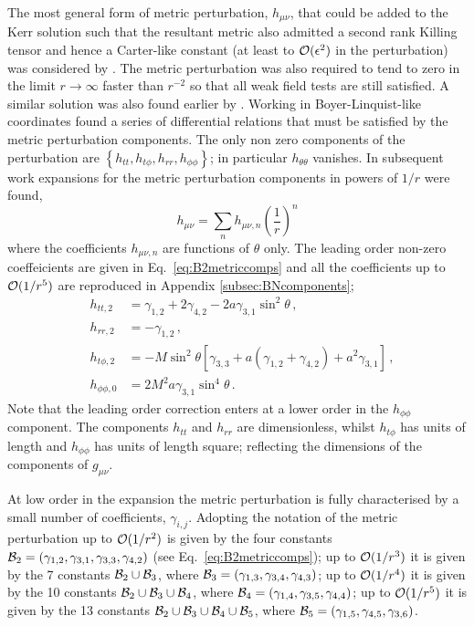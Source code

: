 The most general form of metric perturbation, $h_{\mu\nu}$, that could be added to the Kerr solution such that the resultant metric also admitted a second rank Killing tensor and hence a Carter-like constant (at least to ${\cal{O}} (\epsilon ^{2})$ in the perturbation) was considered by \cite{2011PhRvD..83j4027V}. The metric perturbation was also required to tend to zero in the limit $r\rightarrow\infty$ faster than $r^{-2}$ so that all weak field tests are still satisfied. A similar solution was also found earlier by \cite{1979GReGr..10...79B}. Working in Boyer-Linquist-like coordinates \cite{2011PhRvD..83j4027V} found a series of differential relations that must be satisfied by the metric perturbation components. The only non zero components of the perturbation are $\left\{ h_{tt}, h_{t \phi }, h_{rr}, h_{ \phi \phi } \right\}$; in particular $h_{\theta\theta}$ vanishes. In subsequent work \cite{2011PhRvD..84f4016G} expansions for the metric perturbation components in powers of $1/r$ were found,
\begin{equation} h_{\mu \nu}=\sum_{n}h_{\mu \nu, n}\left( \frac{1}{r} \right)^{n} \end{equation}
where the coefficients $h_{\mu \nu , n}$ are functions of $\theta$ only. The leading order non-zero coeffeicients are given in Eq.\ \ref{eq:B2metriccomps} and all the coefficients up to ${\cal{O}}(1/r^{5})$ are reproduced in Appendix \ref{subsec:BNcomponents};
\begin{eqnarray}\label{eq:B2metriccomps}
&h_{tt,2}&=\gamma_{1,2}+2\gamma_{4,2}-2a\gamma_{3,1}\sin^{2}\theta \, , \nonumber \\
&h_{rr,2}&=-\gamma_{1,2}\, ,\nonumber\\
&h_{t\phi,2}&=-M\sin^{2}\theta\left[ \gamma_{3,3}+a\left(\gamma_{1,2}+\gamma_{4,2} \right) +a^{2}\gamma_{3,1} \right] \, , \nonumber \\
&h_{\phi\phi,0}&=2M^{2}a\gamma_{3,1}\sin^{4}\theta\, .
\end{eqnarray}
Note that the leading order correction enters at a lower order in the $h_{\phi\phi}$ component. The components $h_{tt}$ and $h_{rr}$ are dimensionless, whilst $h_{t\phi}$ has units of length and $h_{\phi\phi}$ has units of length square; reflecting the dimensions of the components of $g_{\mu\nu}$.

At low order in the expansion the metric perturbation is fully characterised by a small number of coefficients, $\gamma_{i,j}$. Adopting the notation of \cite{2011PhRvD..84f4016G} the metric perturbation up to ${\cal{O}}(1/r^{2})$ is given by the four constants ${\cal{B}}_{2}=\left(\gamma_{1,2},\gamma_{3,1},\gamma_{3,3},\gamma_{4,2}\right)$ (see Eq.\ \ref{eq:B2metriccomps}); up to ${\cal{O}}(1/r^{3})$ it is given by the 7 constants ${\cal{B}}_{2}\cup{\cal{B}}_{3}$, where ${\cal{B}}_{3}=(\gamma_{1,3}, \gamma_{3,4}, \gamma_{4,3})$; up to ${\cal{O}}(1/r^{4})$ it is given by the 10 constants ${\cal{B}}_{2}\cup{\cal{B}}_{3}\cup{\cal{B}}_{4}$, where ${\cal{B}}_{4}=(\gamma_{1,4}, \gamma_{3,5}, \gamma_{4,4})$; up to
${\cal{O}}(1/r^{5})$ it is given by the 13 constants ${\cal{B}}_{2}\cup{\cal{B}}_{3}\cup{\cal{B}}_{4}\cup{\cal{B}}_{5}$, where ${\cal{B}}_{5}=(\gamma_{1,5}, \gamma_{4,5}, \gamma_{3,6})$.

